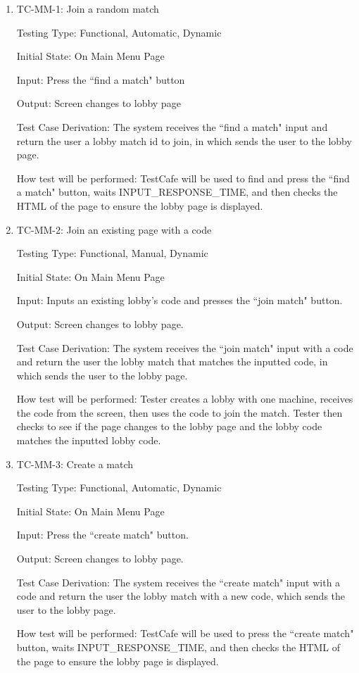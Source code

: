 \documentclass[12pt, titlepage]{article}
\begin{document}
\begin{enumerate}

\item{TC-MM-1: Join a random match}

Testing Type: Functional, Automatic, Dynamic
					
Initial State: On Main Menu Page
					
Input: Press the ``find a match" button
					
Output: Screen changes to lobby page

Test Case Derivation: The system receives the ``find a match" input and return the user a lobby match id to join, in which sends the user to the lobby page.
					
How test will be performed: TestCafe will be used to find and press the ``find a match" button, waits INPUT\_RESPONSE\_TIME, and then checks the HTML of the page to ensure the lobby page is displayed.
					
\item{TC-MM-2: Join an existing page with a code}

Testing Type: Functional, Manual, Dynamic
					
Initial State: On Main Menu Page
					
Input: Inputs an existing lobby's code and presses the ``join match" button.
					
Output: Screen changes to lobby page.

Test Case Derivation: The system receives the ``join match" input with a code and return the user the lobby match that matches the inputted code, in which sends the user to the lobby page.
					
How test will be performed: Tester creates a lobby with one machine, receives the code from the screen, then uses the code to join the match. Tester then checks to see if the page changes to the lobby page and the lobby code matches the inputted lobby code.

\item{TC-MM-3: Create a match}

Testing Type: Functional, Automatic, Dynamic 
					
Initial State: On Main Menu Page
					
Input: Press the ``create match" button.
					
Output: Screen changes to lobby page.

Test Case Derivation: The system receives the ``create match" input with a code and return the user the lobby match with a new code, which sends the user to the lobby page.
					
How test will be performed: TestCafe will be used to press the ``create match" button, waits INPUT\_RESPONSE\_TIME, and then checks the HTML of the page to ensure the lobby page is displayed.

\end{enumerate}
\end{document}
